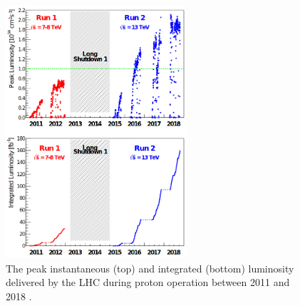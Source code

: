 \begin{figure}
\centering
\includegraphics[width=0.6\textwidth]{figures/lhc_and_cms/lhc_lumi.png}
\caption{The peak instantaneous (top) and integrated (bottom) luminosity delivered by the LHC during proton operation between 2011 and 2018 \cite{lhc_run2_operation}.}
\label{lhc_lumi}
\end{figure}